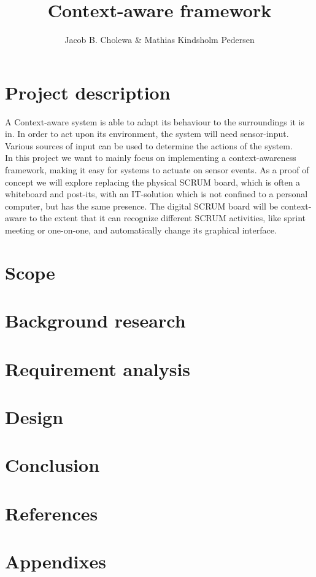 \documentclass[]{report}
\title{Context-aware framework}
\author{Jacob B. Cholewa \& Mathias Kindsholm Pedersen}
\begin{document}
\maketitle

\begin{abstract}
\end{abstract}

\chapter{Project description}
A Context-aware system is able to adapt its behaviour to the surroundings it is in. In order to act upon its environment, the system will need sensor-input. Various sources of input can be used to determine the actions of the system.\\

In this project we want to mainly focus on implementing a context-awareness framework, making it easy for systems to actuate on sensor events. As a proof of concept we will explore replacing the physical SCRUM board, which is often a whiteboard and post-its, with an IT-solution which is not confined to a personal computer, but has the same presence. The digital SCRUM board will be context-aware to the extent that it can recognize different SCRUM activities, like sprint meeting or one-on-one, and automatically change its graphical interface.
\chapter{Scope}
\chapter{Background research}
\chapter{Requirement analysis}
\chapter{Design}
\chapter{Conclusion}
\chapter{References}
\chapter{Appendixes}
\end{document}
